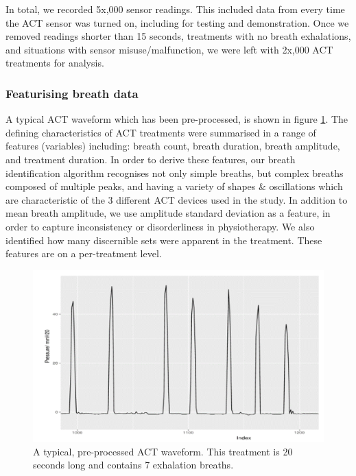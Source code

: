 \documentclass{article}
\begin{document}
In total, we recorded 5x,000 sensor readings. This included data from every time the ACT sensor was turned on, including for testing and demonstration. Once we removed readings shorter than 15 seconds, treatments with no breath exhalations, and situations with sensor misuse/malfunction, we were left with 2x,000 ACT treatments for analysis. 

\subsubsection{Featurising breath data}

A typical ACT waveform which has been pre-processed, is shown in figure \ref{fig:individual_breaths}. The defining characteristics of ACT treatments were summarised in a range of features (variables) including: breath count, breath duration, breath amplitude, and treatment duration. In order to derive these features, our breath identification algorithm recognises not only simple breaths, but complex breaths composed of multiple peaks, and having a variety of shapes & oscillations which are characteristic of the 3 different ACT devices used in the study. In addition to mean breath amplitude, we use amplitude standard deviation as a feature, in order to capture inconsistency or disorderliness in physiotherapy. We also identified how many discernible sets were apparent in the treatment. These features are on a per-treatment level. 

\begin{figure}[htb]
  \includegraphics[width=\textwidth]{individual_breaths.png}
  \centering
   \caption{A typical, pre-processed ACT waveform. This treatment is 20 seconds long and contains 7 exhalation breaths.}
  \label{fig:individual_breaths}
\end{figure}
\end{document}
